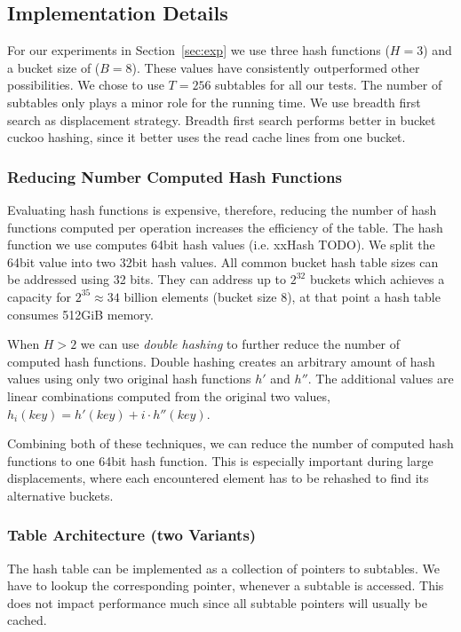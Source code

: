 \documentclass[a4paper,UKenglish]{lipics-v2016}
\begin{document}
\subsection{Implementation Details}
For our experiments in Section~\ref{sec:exp} we use three hash
functions ($H=3$) and a bucket size of ($B=8$). These values have
consistently outperformed other possibilities.  We chose to use
$T=256$ subtables for all our tests.  The number of subtables only
plays a minor role for the running time.  We use breadth first search
as displacement strategy. Breadth first search performs better in
bucket cuckoo hashing, since it better uses the read cache lines from
one bucket.

\subsubsection*{Reducing Number Computed Hash Functions}
Evaluating hash functions is expensive, therefore, reducing the number
of hash functions computed per operation increases the efficiency of
the table.  The hash function we use computes 64bit hash values
(i.e. xxHash TODO).  We split the 64bit value into two 32bit hash
values. All common bucket hash table sizes can be addressed using 32
bits. They can address up to $2^{32}$ buckets which achieves a
capacity for $2^{35} \approx 34$ billion elements (bucket size 8),
at that point a hash table consumes 512GiB memory.

When $H > 2$ we can use \emph{double hashing} to further reduce the number
of computed hash functions. Double hashing creates an arbitrary amount
of hash values using only two original hash functions $h'$ and
$h''$.  The additional values are linear combinations computed
from the original two values, $h_i(key) = h'(key) + i\cdot
h''(key)$.

Combining both of these techniques, we can reduce the number of
computed hash functions to one 64bit hash function.  This is
especially important during large displacements, where each
encountered element has to be rehashed to find its alternative
buckets.

\subsubsection*{Table Architecture (two Variants)}
\label{sec:dys_inplace}
The hash table can be implemented as a collection of pointers to
subtables. We have to lookup the corresponding pointer, whenever a
subtable is accessed.  This does not impact performance much since all
subtable pointers will usually be cached.
\end{document}
